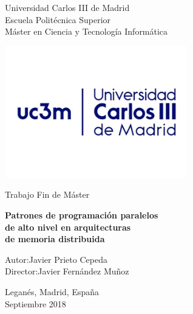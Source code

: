 \documentclass[10.5pt,twoside]{mitthesis}
\begin{document}

\begin{titlepage}
    \begin{center}
        \vspace*{1cm}
     
        \Large
        Universidad Carlos III de Madrid\\
        Escuela Politécnica Superior\\
        Máster en Ciencia y Tecnología Informática
        
        \vspace{0.3cm}
        
        \centering        
        \includegraphics[width=0.6\textwidth]{figures/uc3m}
        
        \vspace{0.6cm}
        
        \LARGE
        Trabajo Fin de Máster
        
        \Huge
		\textbf{Patrones de programación paralelos\\de alto nivel en arquitecturas\\de memoria distribuida}        
        
        \vspace{0.5cm}
        
        \vspace{1.5cm}
        
        \Large
        \begin{changemargin}{3.8cm}{3.8cm}
        Autor:\hfill Javier Prieto Cepeda\\
        Director:\hfill Javier Fernández Muñoz\\
        \end{changemargin}
		\begin{changemargin}{3.8cm}{3.8cm}
		\begin{flushright}		        
        \vspace{0.5cm}
        Leganés, Madrid, España\\
        Septiembre 2018
 		\end{flushright}
        \end{changemargin}
        
        \vfill
        
    \end{center}
\end{titlepage}
\end{document}
